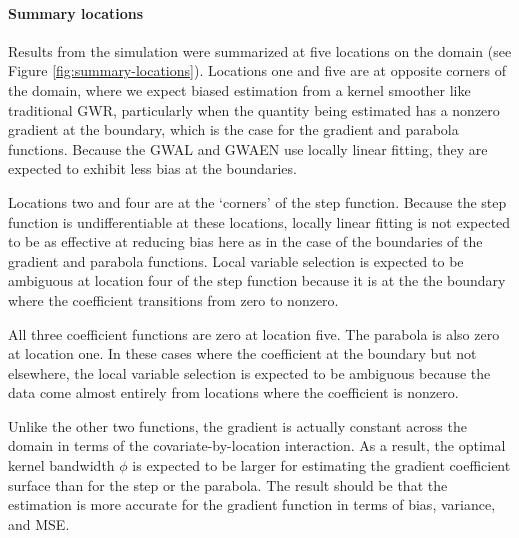 \documentclass[authoryear, review, 11pt]{elsarticle}
\begin{document}
	\paragraph{Summary locations}Results from the simulation were summarized at five locations on the domain (see Figure \ref{fig:summary-locations}). Locations one and five are at opposite corners of the domain, where we expect biased estimation from a kernel smoother like traditional GWR, particularly when the quantity being estimated has a nonzero gradient at the boundary, which is the case for the gradient and parabola functions. Because the GWAL and GWAEN use locally linear fitting, they are expected to exhibit less bias at the boundaries.
	
	Locations two and four are at the `corners' of the step function. Because the step function is undifferentiable at these locations, locally linear fitting is not expected to be as effective at reducing bias here as in the case of the boundaries of the gradient and parabola functions. Local variable selection is expected to be ambiguous at location four of the step function because it is at the the boundary where the coefficient transitions from zero to nonzero.
	
	All three coefficient functions are zero at location five. The parabola is also zero at location one. In these cases where the coefficient at the boundary but not elsewhere, the local variable selection is expected to be ambiguous because the data come almost entirely from locations where the coefficient is nonzero.
	
	Unlike the other two functions, the gradient is actually constant across the domain in terms of the covariate-by-location interaction. As a result, the optimal kernel bandwidth $\phi$ is expected to be larger for estimating the gradient coefficient surface than for the step or the parabola. The result should be that the estimation is more accurate for the gradient function in terms of bias, variance, and MSE.
	
	
		
\end{document}
